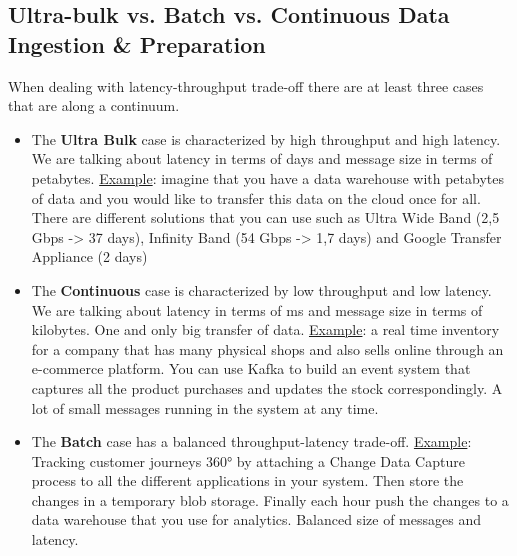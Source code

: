 \documentclass[10pt,a4paper]{article}
\begin{document}
\subsection{Ultra-bulk vs. Batch vs. Continuous Data Ingestion \& Preparation}
When dealing with latency-throughput trade-off there are at least three cases that are along a continuum.
\begin{itemize}
	\item The \textbf{Ultra Bulk} case is characterized by high throughput and high latency. We are talking about latency in terms of days and message size in terms of petabytes.
\uline{Example}:
imagine that you have a data warehouse with petabytes of data and you would like to transfer this data on the cloud once for all. There are different solutions that you can use such as Ultra Wide Band (2,5 Gbps -> 37 days), Infinity Band (54 Gbps -> 1,7 days) and Google Transfer Appliance (2 days)
	\item The \textbf{Continuous} case is characterized by low throughput and low latency. We are talking about latency in terms of ms and message size in terms of kilobytes. One and only big transfer of data.
\uline{Example}:
a real time inventory for a company that has many physical shops and also sells online through an e-commerce platform. You can use Kafka to build an event system that captures all the product purchases and updates the stock correspondingly. A lot of small messages running in the system at any time.
	\item The \textbf{Batch} case has a balanced throughput-latency trade-off.
\uline{Example}:
Tracking customer journeys 360° by attaching a Change Data Capture process to all the different applications in your system. Then store the changes in a temporary blob storage. Finally each hour push the changes to a data warehouse that you use for analytics. Balanced size of messages and latency.
\end{itemize}
\end{document}
